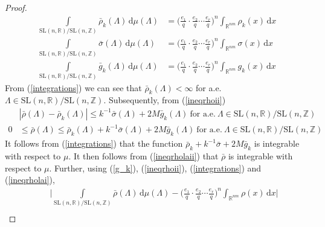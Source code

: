 \documentclass[11pt]{article}
\theoremstyle{definition}
\theoremstyle{proof}
\begin{document}
\begin{proof}
\begin{equation}
\begin{split}
            \int\limits_{\mathrm{SL}(n,\mathbb{R})/\mathrm{SL}(n,\mathbb{Z})} \bar{\rho }_k (\Lambda ) \, \mathrm{d} \mu (\Lambda ) &= {\bigg(\frac{e_1}{q} \cdot \frac{e_2}{q} \cdots \frac{e_r}{q} \bigg)}^n \int_{\mathbb{R}^{nm}} \rho _k (x) \, \mathrm{d} x \\
            \int\limits_{\mathrm{SL}(n,\mathbb{R})/\mathrm{SL}(n,\mathbb{Z})} \bar{\sigma }(\Lambda ) \, \mathrm{d} \mu (\Lambda ) &= {\bigg(\frac{e_1}{q} \cdot \frac{e_2}{q} \cdots \frac{e_r}{q} \bigg)}^n \int_{\mathbb{R}^{nm}} \sigma (x) \, \mathrm{d} x \\
            \int\limits_{\mathrm{SL}(n,\mathbb{R})/\mathrm{SL}(n,\mathbb{Z})} \bar{g}_k (\Lambda ) \, \mathrm{d} \mu (\Lambda ) &= {\bigg(\frac{e_1}{q} \cdot \frac{e_2}{q} \cdots \frac{e_r}{q} \bigg)}^n \int_{\mathbb{R}^{nm}} g_k(x) \, \mathrm{d} x
        \end{split}
    \end{equation}
    From (\ref{integrations}) we can see that $\bar{\rho }_k(\Lambda ) < \infty$ for a.e. $\Lambda \in \mathrm{SL}(n,\mathbb{R})/\mathrm{SL}(n,\mathbb{Z})$.
    Subsequently, from (\ref{ineqrhoii})
    \begin{align}\label{ineqrholai}
        & |\bar{\rho } (\Lambda) - \bar{\rho }_k (\Lambda)| \leq k^{-1} \bar{\sigma }(\Lambda) + 2M \bar{g}_k(\Lambda) \ \text{for a.e.} \ \Lambda \in \mathrm{SL}(n,\mathbb{R})/\mathrm{SL}(n,\mathbb{Z}) \\
        \label{ineqrholaii}
        0 & \leq \bar{\rho }(\Lambda ) \leq \bar{\rho }_k (\Lambda ) + k^{-1} \bar{\sigma }(\Lambda ) +2M \bar{g}_k (\Lambda ) \ \text{for a.e.} \ \Lambda \in \mathrm{SL}(n,\mathbb{R})/\mathrm{SL}(n,\mathbb{Z})
    \end{align}
    It follows from (\ref{integrations}) that the function $\bar{\rho }_k + k^{-1} \bar{\sigma }+2M \bar{g}_k $ is integrable with respect to $\mu$.
    It then follows from (\ref{ineqrholaii}) that $\bar{\rho }$ is integrable with respect to $\mu$.
    Further, using (\ref{g_k}), (\ref{ineqrhoii}), (\ref{integrations}) and (\ref{ineqrholai}),
    \begin{equation*}
        \begin{split}
            & \ \ \ \ \Bigg|\int\limits_{\mathrm{SL}(n,\mathbb{R})/\mathrm{SL}(n,\mathbb{Z})} \bar{\rho }(\Lambda ) \, \mathrm{d} \mu (\Lambda ) - {\bigg(\frac{e_1}{q} \cdot \frac{e_2}{q} \cdots \frac{e_r}{q} \bigg)}^n \int_{\mathbb{R}^{nm}} \rho (x) \, \mathrm{d} x \Bigg| \\

\end{split}
\end{equation*}
\end{proof}
\end{document}
